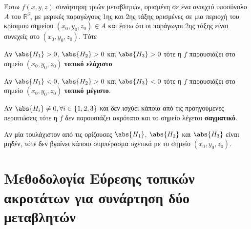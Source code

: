 \begin{thm}
  \label{thm:3var}
\item {}
  Έστω $ f(x,y,z) $ συνάρτηση τριών μεταβλητών, ορισμένη σε ένα ανοιχτό 
  υποσύνολο $A$ του $ \mathbb{R}^{3} $, με μερικές παραγώγους 1ης και 2ης τάξης 
  ορισμένες σε μια  περιοχή του κρίσιμου σημείου $ (x_{0}, y_{0}, z_{0}) \in A $ και 
  έστω ότι οι παράγωγοι 2ης τάξης είναι συνεχείς στο $ (x_{0}, y_{0}, z_{0}) $. Τότε
\end{thm}

\begin{myitemize}
  \item Αν $ \abs{H_{1}} > 0 $, $ \abs{H_{2}} > 0 $ και $ \abs{H_{3}} > 0 $ 
    τότε η $f$ παρουσιάζει στο σημείο $ (x_{0}, y_{0}, z_{0}) $ \textbf{τοπικό ελάχιστο}.
  \item Αν $ \abs{H_{1}} < 0 $, $ \abs{H_{2}} > 0 $ και $ \abs{H_{3}} < 0 $ 
    τότε η $f$ παρουσιάζει στο σημείο $ (x_{0}, y_{0}, z_{0}) $ \textbf{τοπικό
    μέγιστο}.
  \item Αν $ \abs{H_{i}} \neq 0, \forall i \in \{1,2,3\} $ και δεν ισχύει κάποια 
    από τις προηγούμενες περιπτώσεις τότε η $f$ δεν παρουσιάζει ακρότατο και το 
    σημείο λέγεται \textbf{σαγματικό}.
  \item Αν μία τουλάχιστον από τις ορίζουσες $ \abs{H_{1}} $, $ \abs{H_{2}} $ και 
    $ \abs{H_{3}} $ είναι μηδέν, τότε δεν βγαίνει κάποιο συμπέρασμα σχετικά με το 
    σημείο $ (x_{0}, y_{0}, z_{0}) $.
\end{myitemize}

\section{Μεθοδολογία Εύρεσης τοπικών ακροτάτων για συνάρτηση δύο μεταβλητών}


